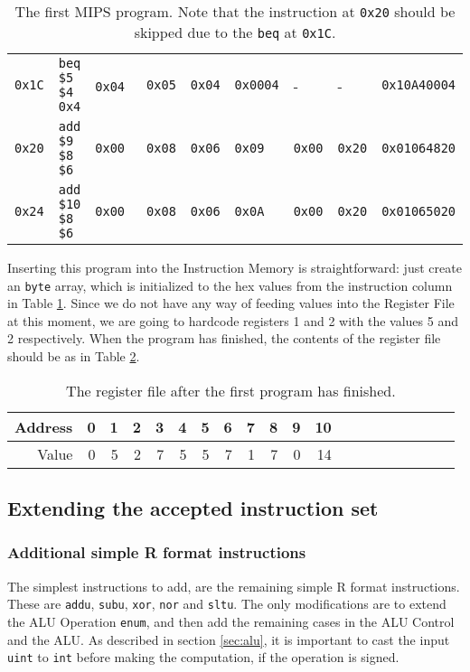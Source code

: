 \begin{table}
\begin{tabular}{rllllllll}
        \texttt{0x1C} & \texttt{beq \$5 \$4 0x4} & \texttt{0x04} &
        \texttt{0x05} & \texttt{0x04} & \texttt{0x0004} & - &
        - & \texttt{0x10A40004} \\ %

        \texttt{0x20} & \texttt{add \$9 \$8 \$6} & \texttt{0x00} &
        \texttt{0x08} & \texttt{0x06} & \texttt{0x09} & \texttt{0x00} &
        \texttt{0x20} & \texttt{0x01064820} \\ %

        \texttt{0x24} & \texttt{add \$10 \$8 \$6} & \texttt{0x00} &
        \texttt{0x08} & \texttt{0x06} & \texttt{0x0A} & \texttt{0x00} &
        \texttt{0x20} & \texttt{0x01065020} \\ %
        \bottomrule
    \end{tabular}
    \caption{The first MIPS program. Note that the instruction at \texttt{0x20}
    should be skipped due to the \texttt{beq} at \texttt{0x1C}.}
    \label{tab:first-program}
\end{table}

Inserting this program into the Instruction Memory is straightforward: just
create an \texttt{byte} array, which is initialized to the hex values from the
instruction column in Table \ref{tab:first-program}. Since we do not have any
way of feeding values into the Register File at this moment, we are going to
hardcode registers 1 and 2 with the values 5 and 2 respectively. When the
program has finished, the contents of the register file should be as in Table
\ref{tab:first-result}.
\begin{table}
    \centering
    \begin{tabular}{rrrrrrrrrrrrrrrrrrrr}
        \toprule
        Address & 0 & 1 & 2 & 3 & 4 & 5 & 6 & 7 & 8 & 9 & 10 \\
        \midrule
        Value & 0 & 5 & 2 & 7 & 5 & 5 & 7 & 1 & 7 & 0 & 14 \\
        \bottomrule
    \end{tabular}
    \caption{The register file after the first program has finished.}
    \label{tab:first-result}
\end{table}

\subsection{Extending the accepted instruction set}
\subsubsection*{Additional simple R format instructions}
The simplest instructions to add, are the remaining simple R format
instructions. These are \texttt{addu}, \texttt{subu}, \texttt{xor},
\texttt{nor} and \texttt{sltu}. The only modifications are to extend the ALU
Operation \texttt{enum}, and then add the remaining cases in the ALU Control
and the ALU. As described in section \ref{sec:alu}, it is important to cast the
input \texttt{uint} to \texttt{int} before making the computation, if the
operation is signed.

